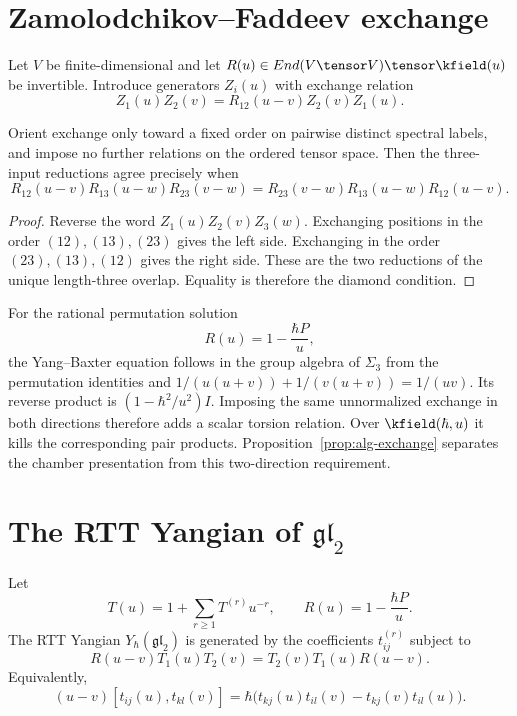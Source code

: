 \chapter{Zamolodchikov--Faddeev exchange}
Let $V$ be finite-dimensional and let $R(u)\in\End(V\tensor V)\tensor\kfield(u)$ be invertible. Introduce generators $Z_i(u)$ with exchange relation
\[
 Z_1(u)Z_2(v)=R_{12}(u-v)Z_2(v)Z_1(u).
\]

\begin{theorem}
Orient exchange only toward a fixed order on pairwise distinct spectral labels, and impose no further relations on the ordered tensor space.
Then the three-input reductions agree precisely when
\[
 R_{12}(u-v)R_{13}(u-w)R_{23}(v-w)
 =R_{23}(v-w)R_{13}(u-w)R_{12}(u-v).
\]
\end{theorem}
\begin{proof}
Reverse the word $Z_1(u)Z_2(v)Z_3(w)$. Exchanging positions in the order $(12),(13),(23)$ gives the left side. Exchanging in the order $(23),(13),(12)$ gives the right side. These are the two reductions of the unique length-three overlap. Equality is therefore the diamond condition.
\end{proof}

For the rational permutation solution
\[
 R(u)=1-\frac{\hbar P}{u},
\]
the Yang--Baxter equation follows in the group algebra of $\Sigma_3$ from the permutation identities and
$1/(u(u+v))+1/(v(u+v))=1/(uv)$.
Its reverse product is $(1-\hbar^2/u^2)I$.
Imposing the same unnormalized exchange in both directions therefore adds a scalar torsion relation. Over $\kfield(\hbar,u)$ it kills the corresponding pair products.
Proposition~\ref{prop:alg-exchange} separates the chamber presentation from this two-direction requirement.

\chapter{The RTT Yangian of \texorpdfstring{$\mathfrak{gl}_2$}{gl2}}
Let
\[
 T(u)=1+\sum_{r\ge1}T^{(r)}u^{-r},
 \qquad R(u)=1-\frac{\hbar P}{u}.
\]
The RTT Yangian $Y_\hbar(\mathfrak{gl}_2)$ is generated by the coefficients $t_{ij}^{(r)}$ subject to
\[
 R(u-v)T_1(u)T_2(v)=T_2(v)T_1(u)R(u-v).
\]
Equivalently,
\[
 (u-v)[t_{ij}(u),t_{kl}(v)]
 =\hbar\bigl(t_{kj}(u)t_{il}(v)-t_{kj}(v)t_{il}(u)\bigr).
\]

